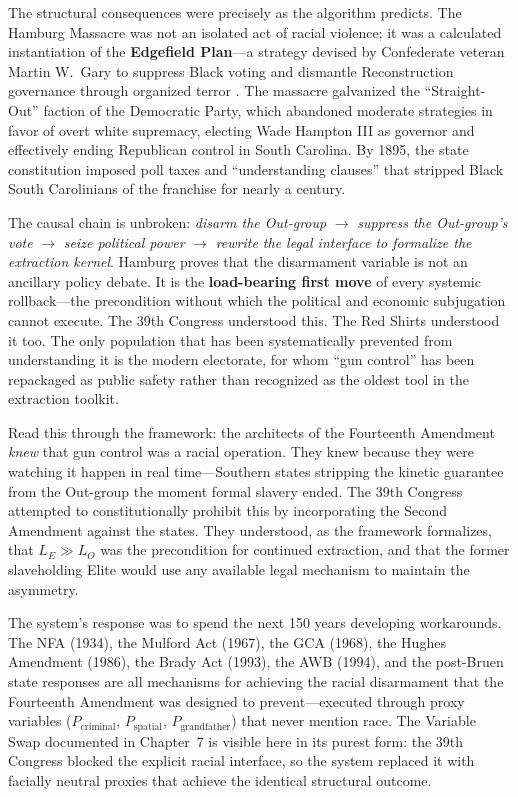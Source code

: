 \documentclass[12pt,openany]{book}
\begin{document}
The structural consequences were precisely as the algorithm predicts. The Hamburg Massacre was not an isolated act of racial violence; it was a calculated instantiation of the \textbf{Edgefield Plan}---a strategy devised by Confederate veteran Martin W.\ Gary to suppress Black voting and dismantle Reconstruction governance through organized terror \cite{hamburg_zinn}. The massacre galvanized the ``Straight-Out'' faction of the Democratic Party, which abandoned moderate strategies in favor of overt white supremacy, electing Wade Hampton III as governor and effectively ending Republican control in South Carolina. By 1895, the state constitution imposed poll taxes and ``understanding clauses'' that stripped Black South Carolinians of the franchise for nearly a century.

The causal chain is unbroken: \textit{disarm the Out-group} $\rightarrow$ \textit{suppress the Out-group's vote} $\rightarrow$ \textit{seize political power} $\rightarrow$ \textit{rewrite the legal interface to formalize the extraction kernel}. Hamburg proves that the disarmament variable is not an ancillary policy debate. It is the \textbf{load-bearing first move} of every systemic rollback---the precondition without which the political and economic subjugation cannot execute. The 39th Congress understood this. The Red Shirts understood it too. The only population that has been systematically prevented from understanding it is the modern electorate, for whom ``gun control'' has been repackaged as public safety rather than recognized as the oldest tool in the extraction toolkit.

\medskip

Read this through the framework: the architects of the Fourteenth Amendment \textit{knew} that gun control was a racial operation. They knew because they were watching it happen in real time---Southern states stripping the kinetic guarantee from the Out-group the moment formal slavery ended. The 39th Congress attempted to constitutionally prohibit this by incorporating the Second Amendment against the states. They understood, as the framework formalizes, that $L_E \gg L_O$ was the precondition for continued extraction, and that the former slaveholding Elite would use any available legal mechanism to maintain the asymmetry.

The system's response was to spend the next 150 years developing workarounds. The NFA (1934), the Mulford Act (1967), the GCA (1968), the Hughes Amendment (1986), the Brady Act (1993), the AWB (1994), and the post-Bruen state responses are all mechanisms for achieving the racial disarmament that the Fourteenth Amendment was designed to prevent---executed through proxy variables ($P_{\text{criminal}}$, $P_{\text{spatial}}$, $P_{\text{grandfather}}$) that never mention race. The Variable Swap documented in Chapter~7 is visible here in its purest form: the 39th Congress blocked the explicit racial interface, so the system replaced it with facially neutral proxies that achieve the identical structural outcome.
\end{document}
